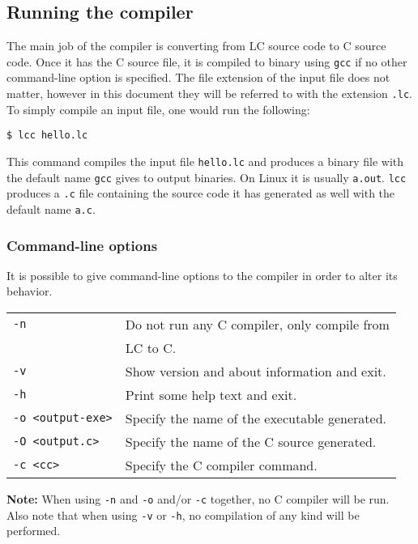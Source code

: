 \documentclass[12pt]{article}
\begin{document}
\subsection{Running the compiler}

The main job of the compiler is converting from LC source code to C source code.
Once it has the C source file, it is compiled to binary using \texttt{gcc} if no
other command-line option is specified. The file extension of the input file
does not matter, however in this document they will be referred to with the
extension \texttt{.lc}. To simply compile an input file, one would run the
following:
\begin{verbatim}
$ lcc hello.lc
\end{verbatim}
This command compiles the input file \texttt{hello.lc} and produces a binary
file with the default name \texttt{gcc} gives to output binaries. On Linux it is
usually \texttt{a.out}. \texttt{lcc} produces a \texttt{.c} file containing the
source code it has generated as well with the default name \texttt{a.c}.

\subsubsection{Command-line options}

It is possible to give command-line options to the compiler in order to alter
its behavior. 

\vspace{7pt}

\begin{tabular}{l l}
    \texttt{-n}\quad& Do not run any C compiler, only compile from \\ 
                    & LC to C. \\
    \texttt{-v}\quad& Show version and about information and exit. \\
    \texttt{-h}\quad& Print some help text and exit. \\
    \texttt{-o <output-exe>}\quad& Specify the name of the executable
        generated. \\
    \texttt{-O <output.c>}\quad& Specify the name of the C source generated. \\
    \texttt{-c <cc>}\quad& Specify the C compiler command.
\end{tabular}

\vspace{8pt}

\textbf{Note:} When using \texttt{-n} and \texttt{-o} and/or \texttt{-c} together,
no C compiler will be run. Also note that when using \texttt{-v} or \texttt{-h},
no compilation of any kind will be performed. 
\end{document}
